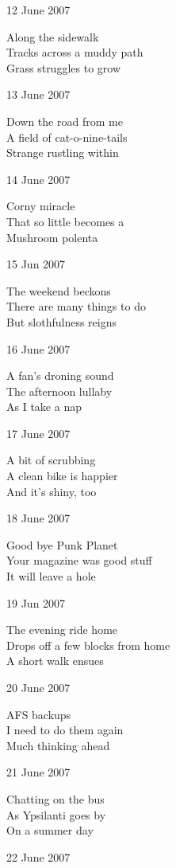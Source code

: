 \documentclass[12pt]{article}
\begin{document}
\newpage

12 June 2007

Along the sidewalk \\
Tracks across a muddy path \\
Grass struggles to grow

13 June 2007

Down the road from me \\
A field of cat-o-nine-tails \\
Strange rustling within

14 June 2007

Corny miracle \\
That so little becomes a \\
Mushroom polenta

15 Jun 2007

The weekend beckons \\
There are many things to do \\
But slothfulness reigns

16 June 2007

A fan's droning sound \\
The afternoon lullaby \\
As I take a nap

17 June 2007

A bit of scrubbing \\
A clean bike is happier \\
And it's shiny, too

18 June 2007

Good bye Punk Planet \\
Your magazine was good stuff \\
It will leave a hole


\newpage


19 Jun 2007

The evening ride home \\
Drops off a few blocks from home \\
A short walk ensues

20 June 2007

AFS backups \\
I need to do them again \\
Much thinking ahead

21 June 2007 

Chatting on the bus \\
As Ypsilanti goes by \\
On a summer day

22 June 2007
\end{document}
